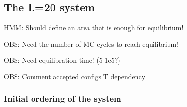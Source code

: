 

\subsection{The L=20 system}

HMM: Should define an area that is enough for equilibrium!

OBS: Need the number of MC cycles to reach equilibrium!

OBS: Need equilibration time! (5 1e5?)

OBS: Comment accepted configs T dependency


\subsubsection{Initial ordering of the system}






